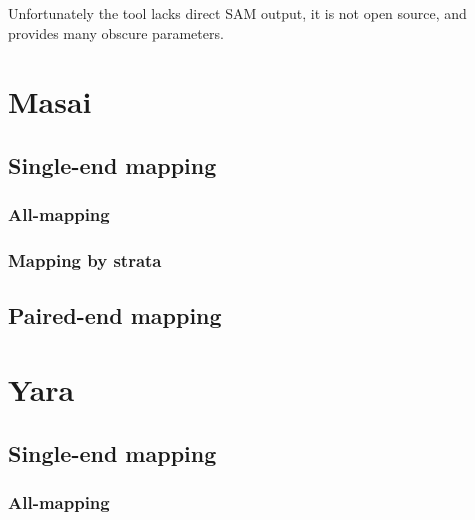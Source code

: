 Unfortunately the tool lacks direct SAM output, it is not open source, and provides many obscure parameters.

\begin{landscape}
\begin{table}[h]
  \center
  \sffamily
	\renewcommand{\tabcolsep}{0.8ex}
	
\end{table}
\end{landscape}


\section{Masai}


\subsection{Single-end mapping}

\subsubsection{All-mapping}
\subsubsection{Mapping by strata}

\subsection{Paired-end mapping}


\section{Yara}


\subsection{Single-end mapping}
\subsubsection{All-mapping}
